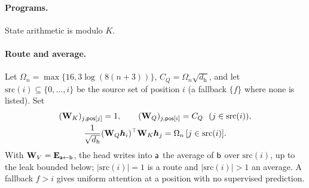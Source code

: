 \paragraph{Programs.} State arithmetic is modulo $K$.
\begin{center}\small
{}
\end{center}

\paragraph{Route and average.} Let $\Omega_n=\max\{16,3\log(8(n+3))\}$, $C_Q=\Omega_n\sqrt{d_{\mathrm h}}$, and let $\mathrm{src}(i)\subseteq\{0,\ldots,i\}$ be the source set
of position $i$ (a fallback $\{f\}$ where none is listed). Set
\begin{equation}
 \begin{gathered}
 (\mathbf W_K)_{j,\reg{pos}[j]}=1,\qquad (\mathbf W_Q)_{j,\reg{pos}[i]}=C_Q\ \ (j\in\mathrm{src}(i)),\\
 \tfrac{1}{\sqrt{d_{\mathrm h}}}(\mathbf W_Q\bm h_i)^\top \mathbf W_K\bm h_j=\Omega_n\,[j\in\mathrm{src}(i)] .
 \end{gathered}
 \label{eq:route}
\end{equation}
With $\mathbf W_V=\mathbf E_{\mathsf{a}\leftarrow\mathsf{b}}$, the head writes into $\mathsf{a}$ the average of $\mathsf{b}$ over $\mathrm{src}(i)$, up to the leak bounded below; $|\mathrm{src}(i)|=1$ is a
route and $|\mathrm{src}(i)|>1$ an average. A fallback $f>i$ gives uniform attention at a position with no supervised prediction.

